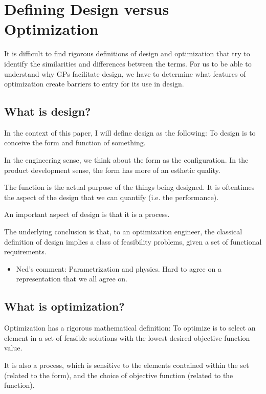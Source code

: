 \section{Defining Design versus Optimization} \label{sec:DesVsOpt}

It is difficult to find rigorous definitions of design and optimization that
try to identify the similarities and differences between the terms. For us to be
able to understand why \gls{GP}s facilitate design, we have to determine what 
features of optimization create barriers to entry for its use in design. 

\subsection{What is design?}

In the context of this paper, I will define design as the following:
	To design is to conceive the form and function of something. 

In the engineering sense, we think about the form as the configuration. 
In the product development sense, the form has more of an esthetic quality. 

The function is the actual purpose of the things being designed. It is oftentimes 
the aspect of the design that we can quantify (i.e. the performance). 

An important aspect of design is that it is a process. 

The underlying conclusion is that, to an optimization engineer, the classical 
definition of design implies a class of feasibility problems, given a set
of functional requirements. 

\begin{itemize}
\item Ned's comment: Parametrization and physics. Hard to agree on a representation 
that we all agree on. 
\end{itemize}

\subsection{What is optimization?}

Optimization has a rigorous mathematical definition: To optimize is to select an 
element in a set of feasible solutions with the lowest desired objective
function value. 

It is also a process, which is sensitive to the elements contained within the set
(related to the form), and the choice of objective function (related to the 
function).


